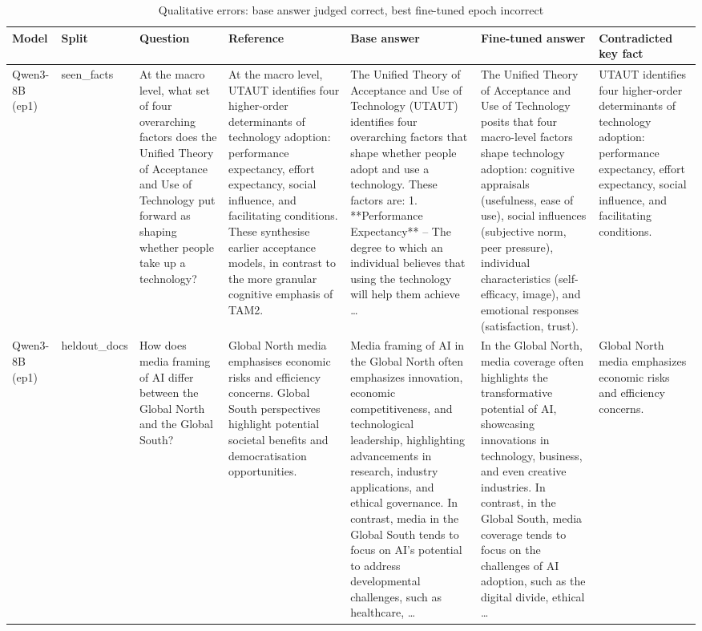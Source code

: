 \begin{table}[t]
\centering
\scriptsize
\caption{Qualitative errors: base answer judged correct, best fine-tuned epoch incorrect}
\label{tab:T6_examples}
\begin{tabular}{p{1.6cm}p{1cm}p{2.4cm}p{2.6cm}p{3.2cm}p{3.2cm}p{2.4cm}}
\toprule
Model & Split & Question & Reference & Base answer & Fine-tuned answer & Contradicted key fact \\
\midrule
Qwen3-8B (ep1) & seen\_facts & At the macro level, what set of four overarching factors does the Unified Theory of Acceptance and Use of Technology put forward as shaping whether people take up a technology? & At the macro level, UTAUT identifies four higher-order determinants of technology adoption: performance expectancy, effort expectancy, social influence, and facilitating conditions. These synthesise earlier acceptance models, in contrast to the more granular cognitive emphasis of TAM2. & The Unified Theory of Acceptance and Use of Technology (UTAUT) identifies four overarching factors that shape whether people adopt and use a technology. These factors are: 1. **Performance Expectancy** – The degree to which an individual believes that using the technology will help them achieve … & The Unified Theory of Acceptance and Use of Technology posits that four macro-level factors shape technology adoption: cognitive appraisals (usefulness, ease of use), social influences (subjective norm, peer pressure), individual characteristics (self-efficacy, image), and emotional responses (satisfaction, trust). & UTAUT identifies four higher-order determinants of technology adoption: performance expectancy, effort expectancy, social influence, and facilitating conditions. \\
Qwen3-8B (ep1) & heldout\_docs & How does media framing of AI differ between the Global North and the Global South? & Global North media emphasises economic risks and efficiency concerns. Global South perspectives highlight potential societal benefits and democratisation opportunities. & Media framing of AI in the Global North often emphasizes innovation, economic competitiveness, and technological leadership, highlighting advancements in research, industry applications, and ethical governance. In contrast, media in the Global South tends to focus on AI's potential to address developmental challenges, such as healthcare, … & In the Global North, media coverage often highlights the transformative potential of AI, showcasing innovations in technology, business, and even creative industries. In contrast, in the Global South, media coverage tends to focus on the challenges of AI adoption, such as the digital divide, ethical … & Global North media emphasizes economic risks and efficiency concerns. \\

\end{tabular}
\end{table}
